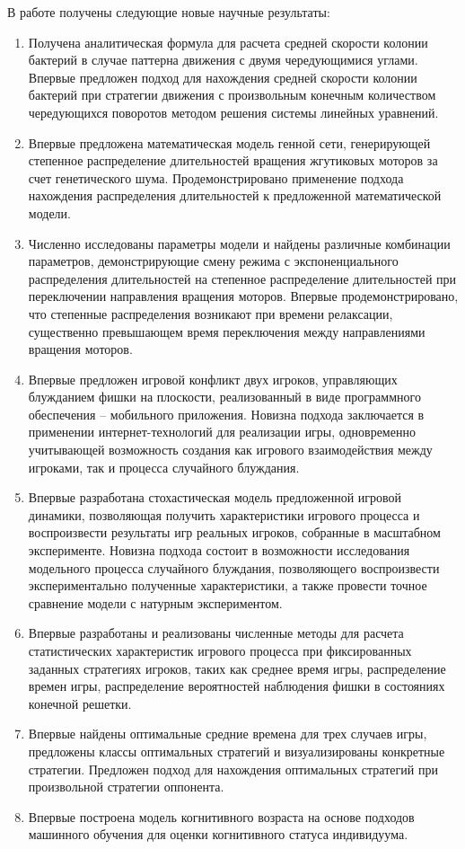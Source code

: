 {\novelty}
В работе получены следующие новые научные результаты:
\begin{enumerate}[beginpenalty=10000] %
  \item Получена аналитическая формула для расчета средней скорости колонии бактерий в случае паттерна движения с двумя чередующимися углами. Впервые предложен подход для нахождения средней скорости колонии бактерий при стратегии движения с произвольным конечным количеством чередующихся поворотов методом решения системы линейных уравнений.
  \item Впервые предложена математическая модель генной сети, генерирующей степенное распределение длительностей вращения жгутиковых моторов за счет генетического шума. Продемонстрировано применение подхода нахождения распределения длительностей к предложенной математической модели.
  \item Численно исследованы параметры модели и найдены различные комбинации параметров, демонстрирующие смену режима с экспоненциального распределения длительностей на степенное распределение длительностей при переключении направления вращения моторов. Впервые продемонстрировано, что степенные распределения возникают при времени релаксации, существенно превышающем время переключения между направлениями вращения моторов.
  \item Впервые предложен игровой конфликт двух игроков, управляющих блужданием фишки на плоскости, реализованный в виде программного обеспечения -- мобильного приложения. Новизна подхода заключается в применении интернет-технологий для реализации игры, одновременно учитывающей возможность создания как  игрового взаимодействия между игроками, так и процесса случайного блуждания.
  \item Впервые разработана стохастическая модель предложенной игровой динамики, позволяющая получить характеристики игрового процесса и воспроизвести результаты игр реальных игроков, собранные в масштабном эксперименте. Новизна подхода состоит в возможности исследования модельного процесса случайного блуждания, позволяющего воспроизвести экспериментально полученные характеристики, а также провести точное сравнение модели с натурным экспериментом.
  \item Впервые разработаны и реализованы численные методы для расчета статистических характеристик игрового процесса при фиксированных заданных стратегиях игроков, таких как среднее время игры, распределение времен игры, распределение вероятностей наблюдения фишки в состояниях конечной решетки. 
  \item Впервые найдены оптимальные средние времена для трех случаев игры, предложены классы оптимальных стратегий и визуализированы конкретные стратегии. Предложен подход для нахождения оптимальных стратегий при произвольной стратегии оппонента.
  \item Впервые построена модель когнитивного возраста на основе подходов машинного обучения для оценки когнитивного статуса индивидуума.
\end{enumerate}

